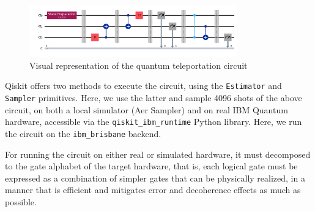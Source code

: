 \documentclass[11pt,a4paper]{article}
\begin{document}









\begin{figure}[H]
    \centering
    \includegraphics[width=0.8\textwidth]{quantum-teleportation-circuit}
    \caption{Visual representation of the quantum teleportation circuit}
    \label{fig:quantum-teleportation-circuit}
\end{figure}

Qiskit offers two methods to execute the circuit, using the \texttt{Estimator} and \texttt{Sampler} primitives. Here, we use the latter and sample 4096 shots of the above circuit, on both a local simulator (Aer Sampler) and on real IBM Quantum hardware, accessible via the \texttt{qiskit\_ibm\_runtime} Python library. Here, we run the circuit on the \texttt{ibm\_brisbane} backend.

For running the circuit on either real or simulated hardware, it must decomposed to the gate alphabet of the target hardware, that is, each logical gate must be expressed as a combination of simpler gates that can be physically realized, in a manner that is efficient and mitigates error and decoherence effects as much as possible.
\end{document}

